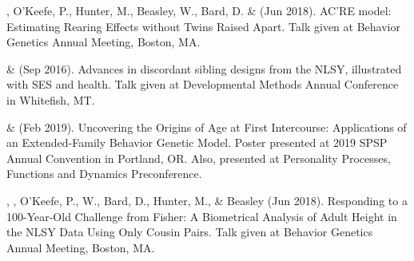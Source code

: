 
\item\meb, O'Keefe, P., Hunter, M., Beasley, W., Bard, D. \& \Joe (Jun 2018). AC'RE model: Estimating Rearing Effects without Twins Raised Apart. Talk given at Behavior Genetics Annual Meeting, Boston, MA. 
\item\meb \& \joe (Sep 2016). Advances in discordant sibling designs from the NLSY, illustrated with SES and health. Talk given at Developmental Methods Annual Conference in Whitefish, MT.\smallskip\\
%
\item \meb \& \Joe (Feb 2019). Uncovering the Origins of Age at First Intercourse: Applications of an Extended-Family Behavior Genetic Model. Poster presented at 2019 SPSP Annual Convention in Portland, OR. Also, presented at Personality Processes, Functions and Dynamics Preconference.

\item\Joe, \meb, O'Keefe, P., W., Bard, D., Hunter, M., \& Beasley (Jun 2018). Responding to a 100-Year-Old Challenge from Fisher: A Biometrical Analysis of Adult Height in the NLSY Data Using Only Cousin Pairs. Talk given at Behavior Genetics Annual Meeting, Boston, MA. 

